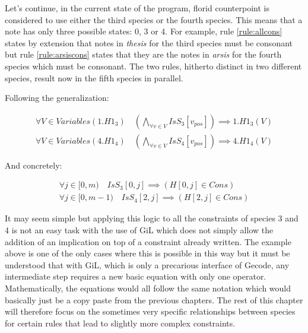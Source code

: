 Let's continue, in the current state of the program, florid counterpoint is considered to use either the third species or the fourth species. This means that a note has only three possible states: 0, 3 or 4. For example, rule \ref{rule:allcons} states by extension that notes in \emph{thesis} for the third species must be consonant but rule \ref{rule:arsiscons} states that they are the notes in \emph{arsis} for the fourth species which must be consonant. The two rules, hitherto distinct in two different species, result now in the fifth species in parallel.

Following the generalization:

\begin{equation} \label{eq:allcons5th}
    \begin{gathered}
        \forall V \in Variables(1.H1_{3})\quad
        \left(\bigwedge_{\forall v \in V} IsS_{3}[v_{pos}]\right) \implies 1.H1_{3}(V)\\
        \forall V \in Variables(4.H1_{4})\quad
        \left(\bigwedge_{\forall v \in V} IsS_{4}[v_{pos}]\right) \implies 4.H1_{4}(V)
    \end{gathered}
\end{equation}

And concretely:

\begin{equation} \label{eq:allcons5th}
    \begin{gathered}
        \forall j \in [0, m)\quad
        IsS_{3}[0, j] \implies (H[0, j] \in Cons)\\
        \forall j \in [0, m-1)\quad
        IsS_{4}[2, j] \implies (H[2, j] \in Cons)
    \end{gathered}
\end{equation}

It may seem simple but applying this logic to all the constraints of species 3 and 4 is not an easy task with the use of GiL which does not simply allow the addition of an implication on top of a constraint already written. The example above is one of the only cases where this is possible in this way but it must be understood that with GiL, which is only a precarious interface of Gecode, any intermediate step requires a new basic equation with only one operator. Mathematically, the equations would all follow the same notation which would basically just be a copy paste from the previous chapters. The rest of this chapter will therefore focus on the sometimes very specific relationships between species for certain rules that lead to slightly more complex constraints.

